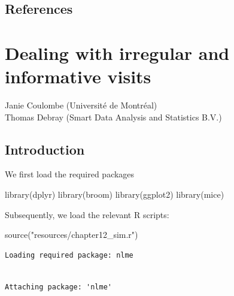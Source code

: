 \documentclass[
  letterpaper,
  DIV=11,
  numbers=noendperiod]{scrreprt}
\newenvironment{Shaded}{\begin{snugshade}}{\end{snugshade}}
\newcommand{\FunctionTok}[1]{\textcolor[rgb]{0.28,0.35,0.67}{#1}}
\newcommand{\NormalTok}[1]{\textcolor[rgb]{0.00,0.23,0.31}{#1}}
\newcommand{\StringTok}[1]{\textcolor[rgb]{0.13,0.47,0.30}{#1}}
\begin{document}
\hypertarget{references-1}{%
\section*{References}\label{references-1}}



\hypertarget{dealing-with-irregular-and-informative-visits}{%
\chapter{Dealing with irregular and informative
visits}\label{dealing-with-irregular-and-informative-visits}}

Janie Coulombe (Université de Montréal)\\
Thomas Debray (Smart Data Analysis and Statistics B.V.)

\hfill\break

\hypertarget{introduction-2}{%
\section{Introduction}\label{introduction-2}}

We first load the required packages

\begin{Shaded}
\begin{Highlighting}[]
\FunctionTok{library}\NormalTok{(dplyr)}
\FunctionTok{library}\NormalTok{(broom)}
\FunctionTok{library}\NormalTok{(ggplot2)}
\FunctionTok{library}\NormalTok{(mice)}
\end{Highlighting}
\end{Shaded}

Subsequently, we load the relevant R scripts:

\begin{Shaded}
\begin{Highlighting}[]
\FunctionTok{source}\NormalTok{(}\StringTok{"resources/chapter12\_sim.r"}\NormalTok{)}
\end{Highlighting}
\end{Shaded}

\begin{verbatim}
Loading required package: nlme
\end{verbatim}

\begin{verbatim}

Attaching package: 'nlme'
\end{verbatim}
\end{document}
